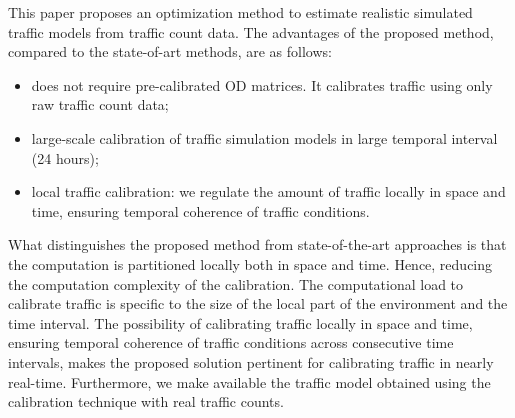 This paper proposes an optimization method to estimate realistic simulated traffic models from traffic count data. The advantages of the proposed method, compared to the state-of-art methods, are as follows:

\begin{itemize}
    \item does not require pre-calibrated OD matrices. It calibrates traffic using only raw traffic count data;
    \item large-scale calibration of traffic simulation models in large temporal interval (24 hours);
    \item local traffic calibration: we regulate the amount of traffic locally in space and time, ensuring temporal coherence of traffic conditions.
\end{itemize}

What distinguishes the proposed method from state-of-the-art approaches is that the computation is partitioned locally both in space and time. Hence, reducing the computation complexity of the calibration. The computational load to calibrate traffic is specific to the size of the local part of the environment and the time interval. The possibility of calibrating traffic locally in space and time, ensuring temporal coherence of traffic conditions across consecutive time intervals, makes the proposed solution pertinent for calibrating traffic in nearly real-time. Furthermore, we make available the traffic model obtained using the calibration technique with real traffic counts.


